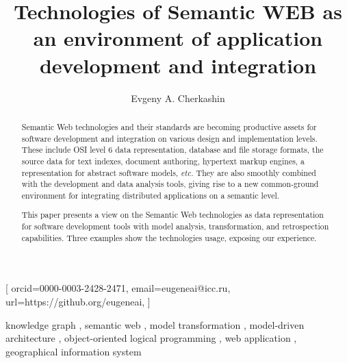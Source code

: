 \documentclass[
]{ceurart}
\begin{document}


\title{Technologies of Semantic WEB as an environment of application development and integration}
\author[1,2]{Evgeny A. Cherkashin}[%
orcid=0000-0003-2428-2471,
email=eugeneai@icc.ru,
url=https://github.org/eugeneai,
]
\address[1]{Matrosov Institute for System Dynamics and Control Theory of Siberian Branch of Russian Academy of Sciences, 134 Lermontov St, Irkutsk, 664033, Russian Federation}

\address[2]{Institute for Mathematics and Information Technologies, Irkutsk State University, 20~Gagarina Bulv, Irkutsk, 664003, Russian Federation}

\begin{abstract}
  Semantic Web technologies and their standards are becoming productive assets for software development and integration on various design and implementation levels. These include OSI level 6 data representation, database and file storage formats, the source data for text indexes, document authoring, hypertext markup engines, a representation for abstract software models, \emph{etc.}  They are also smoothly combined with the development and data analysis tools, giving rise to a new common-ground environment for integrating distributed applications on a semantic level.

  This paper presents a view on the Semantic Web technologies as data representation for software development tools with model analysis, transformation, and retrospection capabilities. Three examples show the technologies usage, exposing our experience.
\end{abstract}

\begin{keywords}
  knowledge graph \sep
  semantic web \sep
  model transformation \sep
  model-driven architecture \sep
  object-oriented logical programming \sep
  web application \sep
  geographical information system
\end{keywords}
\end{document}
